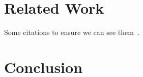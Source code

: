 \documentclass[letterpaper,twocolumn,10pt]{article}
\begin{document}
\section{Related Work}
\label{rw}
Some citations to ensure we can see them~\cite{Christophe:2015:DAU:2819009.2819180, Keil:2013:EDA:2508168.2508176, Lehmann:2019:WFD:3297858.3304068, Sun:2018:EDA:3178372.3179527}.

\section{Conclusion}
\label{end}

% 



\end{document}
